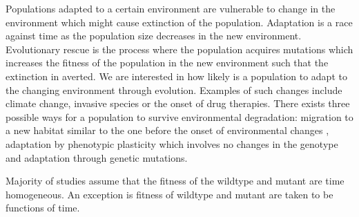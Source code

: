 \documentclass[11pt,a4paper]{article}
\newcommand{\x}{{\bf x}}
\begin{document}
Populations adapted to a certain environment are vulnerable to change in the environment which might cause extinction of the population. Adaptation is a race against time as the population size decreases in the new environment. Evolutionary rescue is the process where the population acquires mutations which increases the fitness of the population in the new environment such that the extinction in averted. We are interested in how likely is a population to adapt to the changing environment through evolution. Examples of such changes include climate change, invasive species or the onset of drug therapies. There exists three possible ways for a population to survive environmental degradation: migration to a new habitat similar to the one before the onset of environmental changes \cite{cobbold2020should}, adaptation by phenotypic plasticity which involves no changes in the genotype\cite{carja2019evolutionary,carja2017evolutionary} and adaptation through genetic mutations\cite{uecker2014evolutionary,uecker2016role,uecker2011fixation}.

Majority of studies assume that the fitness of the wildtype and mutant are time homogeneous. An exception is \cite{marrec2020adapt} fitness of wildtype and mutant are taken to be functions of time.

\begin{figure}
\centering
{}
\caption{
}
\label{figureCIN}
\end{figure}
\end{document}
